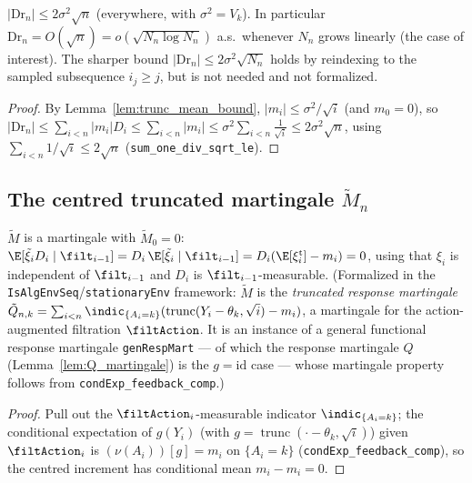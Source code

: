 \begin{lemma}\label{lem:trunc_drift}
\leanok
{}
$|\mathrm{Dr}_n|\le 2\sigma^2\sqrt{n}$ (everywhere, with $\sigma^2=V_k$). In particular
$\mathrm{Dr}_n=O(\sqrt n)=o(\sqrt{N_n\log N_n})$ a.s.\ whenever $N_n$ grows linearly (the case of
interest). The sharper bound $|\mathrm{Dr}_n|\le 2\sigma^2\sqrt{N_n}$ holds by reindexing to the
sampled subsequence $i_j\ge j$, but is not needed and not formalized.
\end{lemma}
\begin{proof}\leanok
{}
By Lemma~\ref{lem:trunc_mean_bound}, $|m_i|\le\sigma^2/\sqrt i$ (and $m_0=0$), so
$|\mathrm{Dr}_n|\le\sum_{i<n}|m_i|D_i\le\sum_{i<n}|m_i|\le\sigma^2\sum_{i<n}\tfrac1{\sqrt i}
\le 2\sigma^2\sqrt n$, using $\sum_{i<n}1/\sqrt i\le 2\sqrt n$
(\texttt{sum\_one\_div\_sqrt\_le}).
\end{proof}

\subsection{The centred truncated martingale $\tilde M_n$}

\begin{lemma}\label{lem:trunc_mart}
\leanok
{}
$\tilde M$ is a martingale with $\tilde M_0=0$: $\E[\tilde\xi_i D_i\mid\filt_{i-1}]
=D_i\,\E[\tilde\xi_i\mid\filt_{i-1}]=D_i(\E[\xi_i^{\mathrm t}]-m_i)=0$, using that $\xi_i$ is
independent of $\filt_{i-1}$ and $D_i$ is $\filt_{i-1}$-measurable.
(Formalized in the \texttt{IsAlgEnvSeq}/\texttt{stationaryEnv} framework: $\tilde M$ is the
\emph{truncated response martingale} $\tilde Q_{n,k}=\sum_{i<n}\indic_{\{A_i=k\}}
(\operatorname{trunc}(Y_i-\theta_k,\sqrt i)-m_i)$, a martingale for the action-augmented
filtration $\filtAction$. It is an instance of a general functional response martingale
\texttt{genRespMart} --- of which the response martingale $Q$ (Lemma~\ref{lem:Q_martingale}) is the
$g=\mathrm{id}$ case --- whose martingale property follows from \texttt{condExp\_feedback\_comp}.)
\end{lemma}
\begin{proof}\leanok
{}
Pull out the $\filtAction_i$-measurable indicator $\indic_{\{A_i=k\}}$; the conditional
expectation of $g(Y_i)$ (with $g=\operatorname{trunc}(\cdot-\theta_k,\sqrt i)$) given
$\filtAction_i$ is $(\nu(A_i))[g]=m_i$ on $\{A_i=k\}$ (\texttt{condExp\_feedback\_comp}), so the
centred increment has conditional mean $m_i-m_i=0$.
\end{proof}

